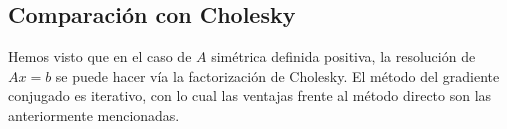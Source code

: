 \subsection{Comparación con Cholesky}

Hemos visto que en el caso de $A$ simétrica definida positiva, la resolución de $Ax = b$ se puede hacer vía la factorización de Cholesky. El método del gradiente conjugado es iterativo, con lo cual las ventajas frente al método directo son las anteriormente mencionadas.